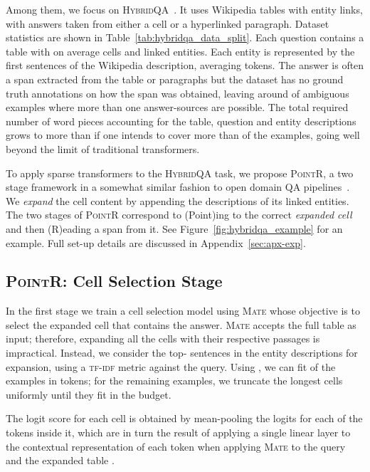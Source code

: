 \documentclass[11pt]{article}
\newcommand{\abr}[1]{\textsc{#1}}
\newcommand\hqa{\textsc{HybridQA}\xspace}
\newcommand{\pointr}{\textsc{PointR}\xspace}
\newcommand{\model}{\textsc{Mate}\xspace}
\begin{document}
Among them, we focus on \hqa~\cite{chen-etal-2020-hybridqa}. 
It uses Wikipedia tables with entity links, with answers taken from either a cell or a hyperlinked paragraph.
Dataset statistics are shown in Table~\ref{tab:hybridqa_data_split}. Each question contains a table with on average  cells and  linked entities. Each entity is represented by the first  sentences of the Wikipedia description, averaging  tokens. The answer is often a span extracted from the table or paragraphs but the dataset has no ground truth annotations on how the span was obtained, leaving around  of ambiguous examples where more than one answer-sources are possible.
The total required number of word pieces accounting for the table, question and entity descriptions grows to more than  if one intends to cover more than  of the examples, going well beyond the limit of traditional transformers.

To apply sparse transformers to the \hqa task, we propose \pointr, a two stage framework in a somewhat similar
fashion to open domain QA pipelines~\cite{chen-etal-2017-reading, lee-19}.
We \emph{expand} the cell content by appending the descriptions of its linked entities.
The two stages of \pointr correspond to (Point)ing to the correct \emph{expanded cell} and then (R)eading a span from it. 
See Figure~\ref{fig:hybridqa_example} for an example. Full set-up details are discussed in Appendix~\ref{sec:apx-exp}.


\subsection{\pointr: Cell Selection Stage}

In the first stage we train a cell selection model using \model whose objective is to select the expanded cell that contains the answer. 
\model accepts the full table as input;
therefore, expanding all the cells with their respective passages is impractical.
Instead, we consider the top- sentences in the entity descriptions for expansion, using a \abr{tf-idf}
metric against the query. Using , we can fit  of the examples in  tokens; for the remaining examples, we truncate the longest cells uniformly until they fit in the budget. 

The logit score  for each cell  is obtained by mean-pooling the logits for each of the tokens  inside it, which are in turn the result of applying a single linear layer to the contextual representation of each token when applying \model to the query  and the expanded table .
\end{document}
